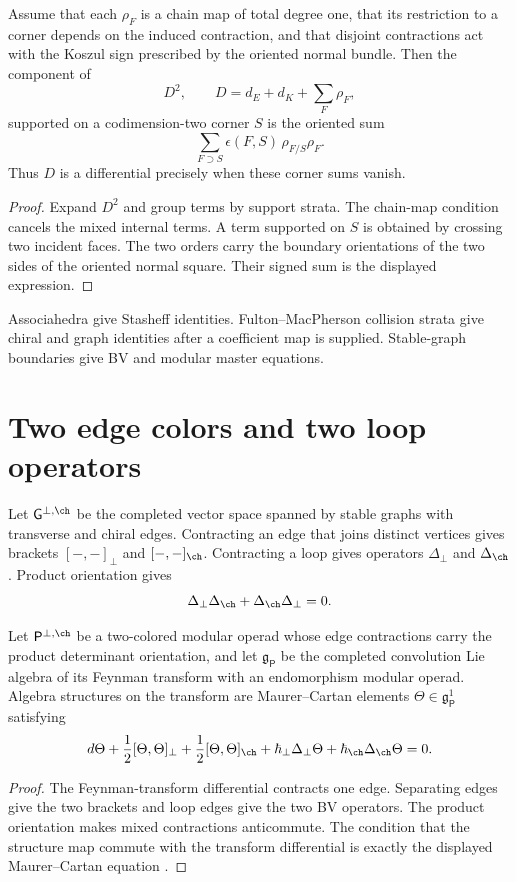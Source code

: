 \begin{theorem}
Assume that each $\rho_F$ is a chain map of total degree one, that its restriction to a corner depends on the induced contraction, and that disjoint contractions act with the Koszul sign prescribed by the oriented normal bundle. Then the component of
\[
 D^2,\qquad D=d_E+d_K+\sum_F\rho_F,
\]
supported on a codimension-two corner $S$ is the oriented sum
\[
 \sum_{F\supset S}\epsilon(F,S)\,\rho_{F/S}\rho_F.
\]
Thus $D$ is a differential precisely when these corner sums vanish.
\end{theorem}
\begin{proof}
Expand $D^2$ and group terms by support strata. The chain-map condition cancels the mixed internal terms. A term supported on $S$ is obtained by crossing two incident faces. The two orders carry the boundary orientations of the two sides of the oriented normal square. Their signed sum is the displayed expression.
\end{proof}

Associahedra give Stasheff identities. Fulton--MacPherson collision strata give chiral and graph identities after a coefficient map is supplied. Stable-graph boundaries give BV and modular master equations.

\chapter{Two edge colors and two loop operators}
Let $\mathsf G^{\perp,\ch}$ be the completed vector space spanned by stable graphs with transverse and chiral edges. Contracting an edge that joins distinct vertices gives brackets $[-,-]_\perp$ and $[-,-]_{\ch}$. Contracting a loop gives operators $\Delta_\perp$ and $\Delta_{\ch}$. Product orientation gives
\[
 \Delta_\perp\Delta_{\ch}+\Delta_{\ch}\Delta_\perp=0.
\]

\begin{theorem}
Let $\mathsf P^{\perp,\ch}$ be a two-colored modular operad whose edge contractions carry the product determinant orientation, and let $\mathfrak g_{\mathsf P}$ be the completed convolution Lie algebra of its Feynman transform with an endomorphism modular operad. Algebra structures on the transform are Maurer--Cartan elements $\Theta\in\mathfrak g_{\mathsf P}^1$ satisfying
\[
 d\Theta+\frac12[\Theta,\Theta]_\perp
 +\frac12[\Theta,\Theta]_{\ch}
 +\hbar_\perp\Delta_\perp\Theta
 +\hbar_{\ch}\Delta_{\ch}\Theta=0.
\]
\end{theorem}
\begin{proof}
The Feynman-transform differential contracts one edge. Separating edges give the two brackets and loop edges give the two BV operators. The product orientation makes mixed contractions anticommute. The condition that the structure map commute with the transform differential is exactly the displayed Maurer--Cartan equation \cite{GetzlerKapranov}.
\end{proof}

